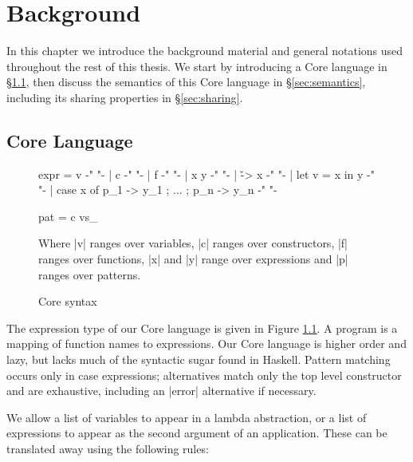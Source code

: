 

\chapter{Background}
\label{chp:background}

In this chapter we introduce the background material and general notations used throughout the rest of this thesis. We start by introducing a Core language in \S\ref{sec:core}, then discuss the semantics of this Core language in \S\ref{sec:semantics}, including its sharing properties in \S\ref{sec:sharing}.

\section{Core Language}
\label{sec:core}

\begin{figure}
\begin{code}
expr  =  v                                          {-"  "-}
      |  c                                          {-"  "-}
      |  f                                          {-"  "-}
      |  x y                                        {-"  "-}
      |  \v -> x                                    {-"  "-}
      |  let v = x in y                             {-"  "-}
      |  case x of {p_1 -> y_1 ; ... ; p_n -> y_n}  {-"  "-}

pat   =  c vs_
\end{code}

Where |v| ranges over variables, |c| ranges over constructors, |f| ranges over functions, |x| and |y| range over expressions and |p| ranges over patterns.
\caption{Core syntax}
\label{fig:core}
\end{figure}

The expression type of our Core language is given in Figure \ref{fig:core}. A program is a mapping of function names to expressions. Our Core language is higher order and lazy, but lacks much of the syntactic sugar found in Haskell. Pattern matching occurs only in case expressions; alternatives match only the top level constructor and are exhaustive, including an |error| alternative if necessary.

We allow a list of variables to appear in a lambda abstraction, or a list of expressions to appear as the second argument of an application. These can be translated away using the following rules:

